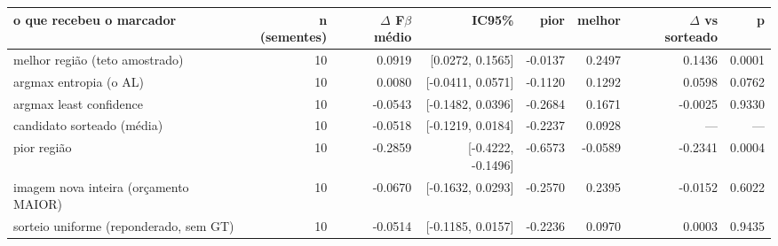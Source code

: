 \begin{tabular}{lrrrrrrr}
\hline
o que recebeu o marcador & n (sementes) & $\Delta$ F$\beta$ médio & IC95\% & pior & melhor & $\Delta$ vs sorteado & p \\
\hline
melhor região (teto amostrado) & 10 & 0.0919 & [0.0272, 0.1565] & -0.0137 & 0.2497 & 0.1436 & 0.0001 \\
argmax entropia (o AL) & 10 & 0.0080 & [-0.0411, 0.0571] & -0.1120 & 0.1292 & 0.0598 & 0.0762 \\
argmax least confidence & 10 & -0.0543 & [-0.1482, 0.0396] & -0.2684 & 0.1671 & -0.0025 & 0.9330 \\
candidato sorteado (média) & 10 & -0.0518 & [-0.1219, 0.0184] & -0.2237 & 0.0928 & --- & --- \\
pior região & 10 & -0.2859 & [-0.4222, -0.1496] & -0.6573 & -0.0589 & -0.2341 & 0.0004 \\
imagem nova inteira (orçamento MAIOR) & 10 & -0.0670 & [-0.1632, 0.0293] & -0.2570 & 0.2395 & -0.0152 & 0.6022 \\
sorteio uniforme (reponderado, sem GT) & 10 & -0.0514 & [-0.1185, 0.0157] & -0.2236 & 0.0970 & 0.0003 & 0.9435 \\
\hline
\end{tabular}
